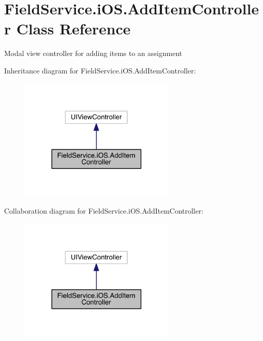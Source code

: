 \hypertarget{class_field_service_1_1i_o_s_1_1_add_item_controller}{\section{Field\+Service.\+i\+O\+S.\+Add\+Item\+Controller Class Reference}
\label{class_field_service_1_1i_o_s_1_1_add_item_controller}
}


Modal view controller for adding items to an assignment  




Inheritance diagram for Field\+Service.\+i\+O\+S.\+Add\+Item\+Controller\+:
\nopagebreak
\begin{figure}[H]
\begin{center}
\leavevmode
\includegraphics[width=210pt]{class_field_service_1_1i_o_s_1_1_add_item_controller__inherit__graph}
\end{center}
\end{figure}


Collaboration diagram for Field\+Service.\+i\+O\+S.\+Add\+Item\+Controller\+:
\nopagebreak
\begin{figure}[H]
\begin{center}
\leavevmode
\includegraphics[width=210pt]{class_field_service_1_1i_o_s_1_1_add_item_controller__coll__graph}
\end{center}
\end{figure}
